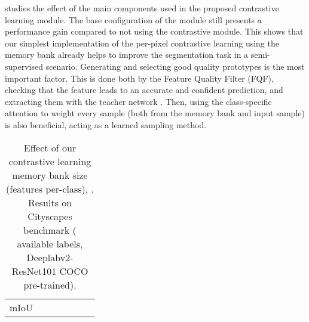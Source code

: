 \documentclass[10pt,twocolumn,letterpaper]{article}
\begin{document}
 studies the effect of the main components used in the proposed contrastive learning module. 
The base configuration of the module still presents a performance gain compared to not using the contrastive module. This shows that our simplest implementation of the per-pixel contrastive learning using the memory bank already helps to improve the segmentation task in a semi-supervised scenario. 
Generating and selecting good quality prototypes is the most important factor. This is done both by the Feature Quality Filter (FQF), \ie checking that the feature leads to an accurate and confident prediction, and extracting them with the teacher network . Then, using the class-specific attention  to weight every sample (both from the memory bank and input sample) is also beneficial, acting as a learned sampling method.
 

\begin{table}[!tb]
\caption{Effect of different values for the factor   that weights the effect of the contrastive loss . 
Results on Cityscapes benchmark ( available labels, Deeplabv2-ResNet101 COCO pre-trained).  
}\label{tab:lr}
\begin{center}
\end{center}
\end{table}





\begin{table}[t]
\caption{Effect of our contrastive learning memory bank size (features per-class), . 
Results on Cityscapes benchmark ( available labels, Deeplabv2-ResNet101 COCO pre-trained).}
\label{tab:memory-size}
\begin{center}

\setlength{\tabcolsep}{5pt}
\begin{tabular}{l|cccccc}
\hline 
   &   &  &  &   &    \\ 
 \hline
 mIoU  &    &  &   &      &    \\
\hline
\end{tabular}

\end{center}
\end{table}
\end{document}
